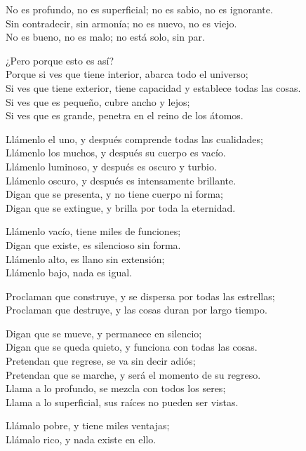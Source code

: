 \documentclass[hidelinks]{memoir}
\begin{document}
	No es profundo, no es superficial; no es sabio, no es ignorante.\\
	Sin contradecir, sin armonía; no es nuevo, no es viejo.\\
	No es bueno, no es malo; no está solo, sin par.
	
	¿Pero porque esto es así?\\
	Porque si ves que tiene interior, abarca todo el universo;\\
	Si ves que tiene exterior, tiene capacidad y establece todas las
	cosas.\\
	Si ves que es pequeño, cubre ancho y lejos;\\
	Si ves que es grande, penetra en el reino de los átomos.
	
	Llámenlo el uno, y después comprende todas las cualidades;\\
	Llámenlo los muchos, y después su cuerpo es vacío.\\
	Llámenlo luminoso, y después es oscuro y turbio.\\
	Llámenlo oscuro, y después es intensamente brillante.\\
	Digan que se presenta, y no tiene cuerpo ni forma;\\
	Digan que se extingue, y brilla por toda la eternidad.
	
	Llámenlo vacío, tiene miles de funciones;\\
	Digan que existe, es silencioso sin forma.\\
	Llámenlo alto, es llano sin extensión;\\
	Llámenlo bajo, nada es igual.
	
	Proclaman que construye, y se dispersa por todas las estrellas;\\
	Proclaman que destruye, y las cosas duran por largo tiempo.
	
	Digan que se mueve, y permanece en silencio;\\
	Digan que se queda quieto, y funciona con todas las cosas.\\
	Pretendan que regrese, se va sin decir adiós;\\
	Pretendan que se marche, y será el momento de su regreso.\\
	Llama a lo profundo, se mezcla con todos los seres;\\
	Llama a lo superficial, sus raíces no pueden ser vistas.
	
	Llámalo pobre, y tiene miles ventajas;\\
	Llámalo rico, y nada existe en ello.
	
\end{document}
